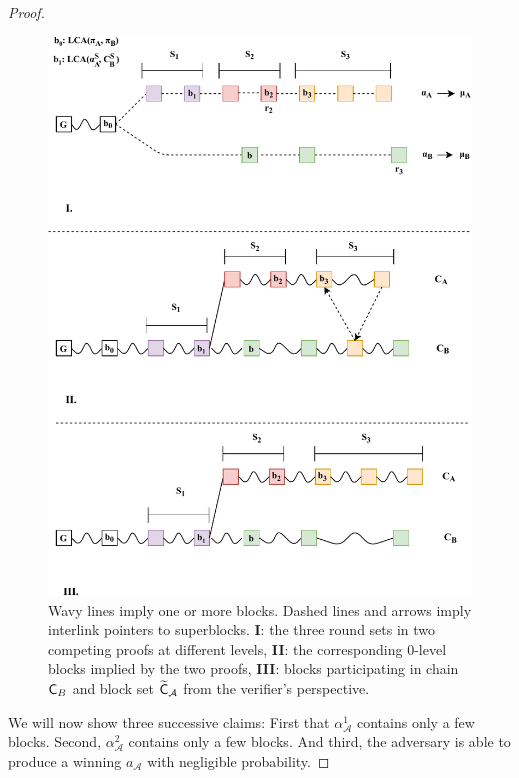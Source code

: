 \begin{proof}
\begin{figure}[h!]
    \begin{center}
        \includegraphics[width=\columnwidth]{figures/proof_velvet-crop.pdf}
    \end{center}
    \caption{Wavy lines imply one or more blocks. Dashed lines and arrows imply interlink pointers to superblocks. \textbf{I}: the three round sets in two competing proofs at different levels, \textbf{II}: the corresponding 0-level blocks implied by the two proofs, \textbf{III}: blocks participating in chain $\mathsf{C}_B$ and block set $\widetilde{\mathsf{C}}_\mathcal{A}$ from the verifier's perspective.}
    \label{fig:proof_velvet}
\end{figure}

We will now show three successive claims: First that $\alpha_\mathcal{A}^1$ contains only a few blocks. Second,  $\alpha_\mathcal{A}^2$ contains only a few blocks. And third, the adversary is able to produce a winning $a_\mathcal{A}$ with negligible probability.


\end{proof}

